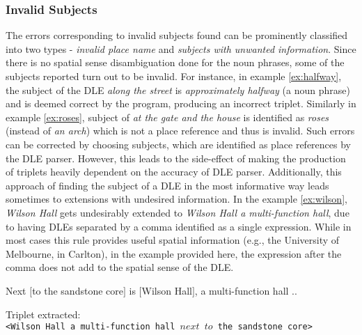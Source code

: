 \documentclass{acm_proc_article-sp}
\begin{document}
\subsubsection{Invalid Subjects} 
The errors corresponding to invalid subjects found can be prominently classified into two types - \textit{invalid place name} and \textit{subjects with unwanted information}. Since there is no spatial sense disambiguation done for the noun phrases, some of the subjects reported turn out to be invalid. For instance, in example \ref{ex:halfway}, the subject of the DLE \textit{along the street} is \textit{approximately halfway} (a noun phrase) and is deemed correct by the program, producing an incorrect triplet. Similarly in example \ref{ex:roses}, subject of \textit{at the gate and the house} is identified as \textit{roses} (instead of \textit{an arch}) which is not a place reference and thus is invalid. Such errors can be corrected by choosing subjects, which are identified as place references by the DLE parser. However, this leads to the side-effect of making the production of triplets heavily dependent on the accuracy of DLE parser.
Additionally, this approach of finding the subject of a DLE in the most informative way leads sometimes to extensions with undesired information. In the example \ref{ex:wilson}, \textit{Wilson Hall} gets undesirably extended to \textit{Wilson Hall a multi-function hall}, due to having DLEs separated by a comma identified as a single expression. While in most cases this rule provides useful spatial information (e.g., the University of Melbourne, in Carlton), in the example provided here, the expression after the comma does not add to the spatial sense of the DLE. 
\begin{example}
\label{ex:wilson}
Next $[$to the sandstone core$]$ is $[$Wilson Hall$]$, a multi-function hall ..
\end{example}
Triplet extracted:\\
\texttt{<Wilson Hall a multi-function hall $next$ $to$ the sandstone core>}
\end{document}
